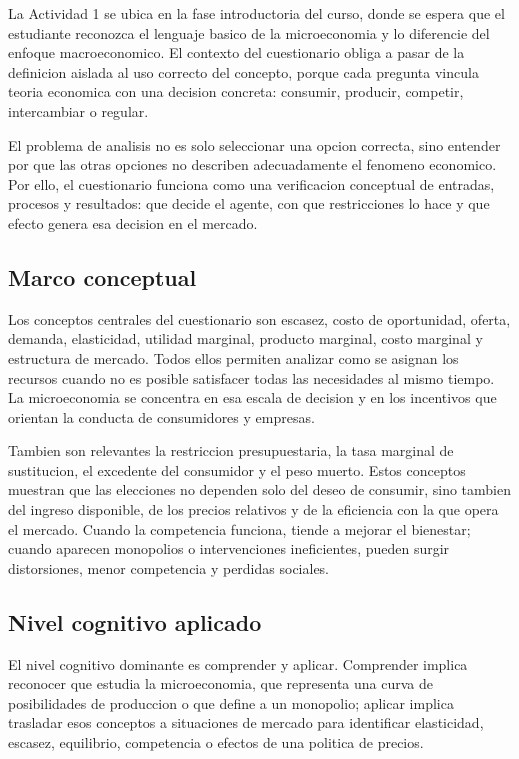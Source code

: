 \documentclass[
	spanish,
	letterpaper, oneside
]{article}
\begin{document}
La Actividad 1 se ubica en la fase introductoria del curso, donde se espera que el estudiante reconozca el lenguaje basico de la microeconomia y lo diferencie del enfoque macroeconomico. El contexto del cuestionario obliga a pasar de la definicion aislada al uso correcto del concepto, porque cada pregunta vincula teoria economica con una decision concreta: consumir, producir, competir, intercambiar o regular.

El problema de analisis no es solo seleccionar una opcion correcta, sino entender por que las otras opciones no describen adecuadamente el fenomeno economico. Por ello, el cuestionario funciona como una verificacion conceptual de entradas, procesos y resultados: que decide el agente, con que restricciones lo hace y que efecto genera esa decision en el mercado.

\subsection{Marco conceptual}

Los conceptos centrales del cuestionario son escasez, costo de oportunidad, oferta, demanda, elasticidad, utilidad marginal, producto marginal, costo marginal y estructura de mercado. Todos ellos permiten analizar como se asignan los recursos cuando no es posible satisfacer todas las necesidades al mismo tiempo. La microeconomia se concentra en esa escala de decision y en los incentivos que orientan la conducta de consumidores y empresas.

Tambien son relevantes la restriccion presupuestaria, la tasa marginal de sustitucion, el excedente del consumidor y el peso muerto. Estos conceptos muestran que las elecciones no dependen solo del deseo de consumir, sino tambien del ingreso disponible, de los precios relativos y de la eficiencia con la que opera el mercado. Cuando la competencia funciona, tiende a mejorar el bienestar; cuando aparecen monopolios o intervenciones ineficientes, pueden surgir distorsiones, menor competencia y perdidas sociales.

\subsection{Nivel cognitivo aplicado}

El nivel cognitivo dominante es comprender y aplicar. Comprender implica reconocer que estudia la microeconomia, que representa una curva de posibilidades de produccion o que define a un monopolio; aplicar implica trasladar esos conceptos a situaciones de mercado para identificar elasticidad, escasez, equilibrio, competencia o efectos de una politica de precios.
\end{document}
